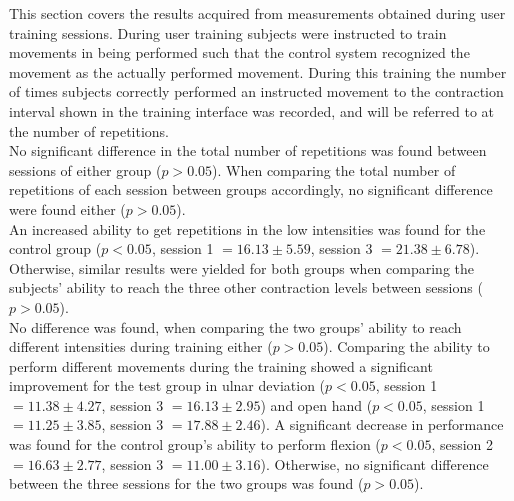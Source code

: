 \begin{multicols}{2}
This section covers the results acquired from measurements obtained during user training sessions. During user training subjects were instructed to train movements in being performed such that the control system recognized the movement as the actually performed movement. During this training the number of times subjects correctly performed an instructed movement to the contraction interval shown in the training interface was recorded, and will be referred to at the number of repetitions. \\
No significant difference in the total number of repetitions was found between sessions of either group ($p > 0.05$). When comparing the total number of repetitions of each session between groups accordingly, no significant difference were found either ($p > 0.05$). \\ %
An increased ability to get repetitions in the low intensities was found for the control group ($p < 0.05$, session 1 $ = 16.13 \pm 5.59$, session 3 $= 21.38 \pm 6.78$). Otherwise, similar results were yielded for both groups when comparing the subjects' ability to reach the three other contraction levels between sessions ($p > 0.05$).\\
No difference was found, when comparing the two groups' ability to reach different intensities during training either ($p > 0.05$).
Comparing the ability to perform different movements during the training showed a significant improvement for the test group in ulnar deviation ($p < 0.05$, session 1 $ = 11.38 \pm 4.27$, session 3 $= 16.13 \pm 2.95$) and open hand ($p < 0.05$, session 1 $ = 11.25 \pm 3.85$, session 3 $ = 17.88 \pm 2.46$). A significant decrease in performance was found for the control group's ability to perform flexion ($p < 0.05$, session 2 $ = 16.63 \pm 2.77$, session 3 $ = 11.00 \pm 3.16$). Otherwise, no significant difference between the three sessions for the two groups was found ($p > 0.05$).\\ %

\end{multicols}
